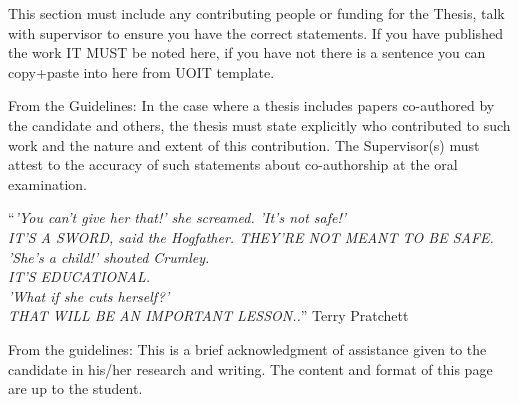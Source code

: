%
\begin{contributions}
\addchaptertocentry{\contributionsname} 

This section must include any contributing people or funding for the Thesis, talk with supervisor to ensure you have the correct statements. If you have published the work IT MUST be noted here, if you have not there is a sentence you can copy+paste into here from UOIT template.

From the Guidelines: In the case where a thesis includes papers co-authored by the candidate and others, the thesis must state explicitly who contributed to such work and the nature and extent of this contribution. The Supervisor(s) must attest to the accuracy of such statements about co-authorship at the oral examination.

\end{contributions}



\cleardoublepage

\vspace*{0.2\textheight}

\noindent\enquote{\itshape 'You can't give her that!' she screamed. 'It's not safe!'\\ IT'S A SWORD, said the Hogfather. THEY'RE NOT MEANT TO BE SAFE.\\
'She's a child!' shouted Crumley.\\
IT'S EDUCATIONAL.\\
'What if she cuts herself?'\\
THAT WILL BE AN IMPORTANT LESSON..}\bigbreak
%
\hfill Terry Pratchett

\cleardoublepage



\begin{acknowledgements}
\addchaptertocentry{\acknowledgementname} %
From the guidelines: This is a brief acknowledgment of assistance given to the candidate in his/her research and writing. The content and format of this page are up to the student.
\end{acknowledgements}